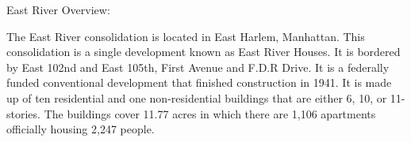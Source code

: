 East River Overview:



The East River consolidation is located in East Harlem, Manhattan. This consolidation is a single development known as East River Houses. It is bordered by East 102nd and East 105th, First Avenue and F.D.R Drive. It is a federally funded conventional development that finished construction in 1941. It is made up of ten residential and one non-residential buildings that are either 6, 10, or 11-stories. The buildings cover 11.77 acres in which there are 1,106 apartments officially housing 2,247 people.